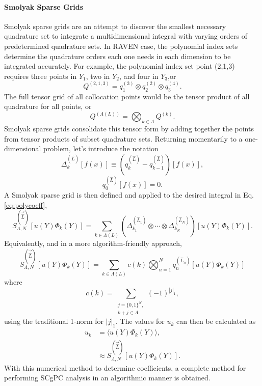 \paragraph{Smolyak Sparse Grids}
Smolyak sparse grids \cite{smolyak} are an attempt to discover the smallest necessary quadrature set to
integrate a multidimensional integral with varying orders of predetermined quadrature sets.  In RAVEN case, the
polynomial index sets determine the quadrature orders each one needs in each dimension to be integrated
accurately.  For example, the polynomial index set point (2,1,3) requires three points in $Y_1$, two in $Y_2$,
and four in $Y_3$,or
\begin{equation}
  Q^{(2,1,3)} = q^{(3)}_1 \otimes q^{(2)}_2 \otimes q^{(4)}_3.
\end{equation}
The full tensor grid of all collocation points would be the tensor product of all quadrature for all points,
or
\begin{equation}
  Q^{(\Lambda(L))} = \bigotimes_{k\in\Lambda}Q^{(k)}.
\end{equation}
Smolyak sparse grids consolidate this tensor form by adding together the points from tensor products of subset
quadrature sets.  Returning momentarily to a one-dimensional problem, let's introduce the notation
\begin{equation}
  \Delta_k^{(\hat L)}[f(x)] \equiv (q_k^{(\hat L)} - q_{k-1}^{(\hat L)})[f(x)],
\end{equation}
\begin{equation}
  q_0^{(\hat L)}[f(x)] = 0.
\end{equation}
A Smolyak sparse grid is then defined and applied to the desired integral in Eq. \ref{eq:polycoeff},
\begin{equation}
  S^{(\vec{\hat L})}_{\Lambda,N}[u(Y)\Phi_k(Y)] = \sum_{k\in\Lambda(L)} \left(\Delta_{k_1}^{(\hat L_1)} \otimes \cdots \otimes
  \Delta_{k_N}^{(\hat L_N)}\right)[u(Y)\Phi_k(Y)].
\end{equation}
Equivalently, and in a more algorithm-friendly approach,
\begin{equation}
  S^{(\vec{\hat L})}_{\Lambda,N}[u(Y)\Phi_k(Y)] = \sum_{k\in\Lambda(L)} c(k)\bigotimes_{n=1}^N
  q^{(\hat L_n)}_n[u(Y)\Phi_k(Y)]
\end{equation}
where
\begin{equation}
  c(k) = \sum_{\substack{j=\{0,1\}^N,\\k+j\in\Lambda}} (-1)^{|j|_1},
\end{equation}
using the traditional 1-norm for $|j|_1$.
The values for $u_k$ can then be calculated as
\begin{align}
  u_k &= \langle u(Y)\Phi_k(Y) \rangle,\\
      &\approx S^{(\vec{\hat L})}_{\Lambda,N}[u(Y)\Phi_k(Y)].
\end{align}
With this numerical method to determine coefficients,  a complete method for performing SCgPC
analysis in an algorithmic manner is obtained.
